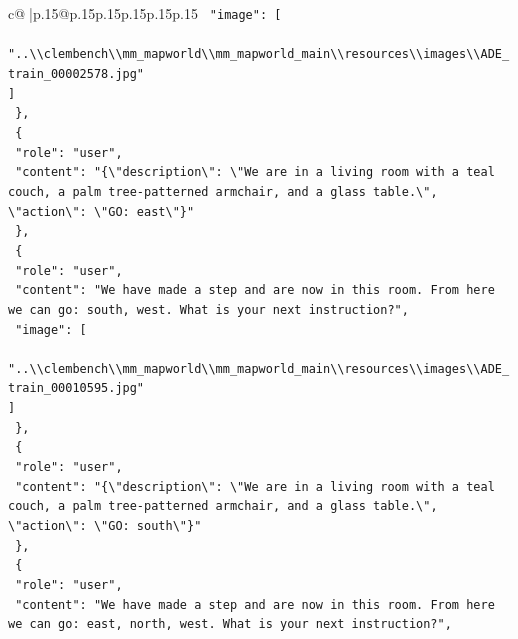 \documentclass{article}
\begin{document}
{\begin{supertabular}{c@{$\;$}|p{.15\linewidth}@{}p{.15\linewidth}p{.15\linewidth}p{.15\linewidth}p{.15\linewidth}p{.15\linewidth}}
{{{\texttt{    "image": {[}} \\
\texttt{      "..\textbackslash{}\textbackslash{}clembench\textbackslash{}\textbackslash{}mm\_mapworld\textbackslash{}\textbackslash{}mm\_mapworld\_main\textbackslash{}\textbackslash{}resources\textbackslash{}\textbackslash{}images\textbackslash{}\textbackslash{}ADE\_train\_00002578.jpg"} \\
\texttt{    {]}} \\
\texttt{  \},} \\
\texttt{  \{} \\
\texttt{    "role": "user",} \\
\texttt{    "content": "\{\textbackslash{}"description\textbackslash{}": \textbackslash{}"We are in a living room with a teal couch, a palm tree{-}patterned armchair, and a glass table.\textbackslash{}", \textbackslash{}"action\textbackslash{}": \textbackslash{}"GO: east\textbackslash{}"\}"} \\
\texttt{  \},} \\
\texttt{  \{} \\
\texttt{    "role": "user",} \\
\texttt{    "content": "We have made a step and are now in this room. From here we can go: south, west. What is your next instruction?",} \\
\texttt{    "image": {[}} \\
\texttt{      "..\textbackslash{}\textbackslash{}clembench\textbackslash{}\textbackslash{}mm\_mapworld\textbackslash{}\textbackslash{}mm\_mapworld\_main\textbackslash{}\textbackslash{}resources\textbackslash{}\textbackslash{}images\textbackslash{}\textbackslash{}ADE\_train\_00010595.jpg"} \\
\texttt{    {]}} \\
\texttt{  \},} \\
\texttt{  \{} \\
\texttt{    "role": "user",} \\
\texttt{    "content": "\{\textbackslash{}"description\textbackslash{}": \textbackslash{}"We are in a living room with a teal couch, a palm tree{-}patterned armchair, and a glass table.\textbackslash{}", \textbackslash{}"action\textbackslash{}": \textbackslash{}"GO: south\textbackslash{}"\}"} \\
\texttt{  \},} \\
\texttt{  \{} \\
\texttt{    "role": "user",} \\
\texttt{    "content": "We have made a step and are now in this room. From here we can go: east, north, west. What is your next instruction?",} \\
}}}
\end{supertabular}}
\end{document}
